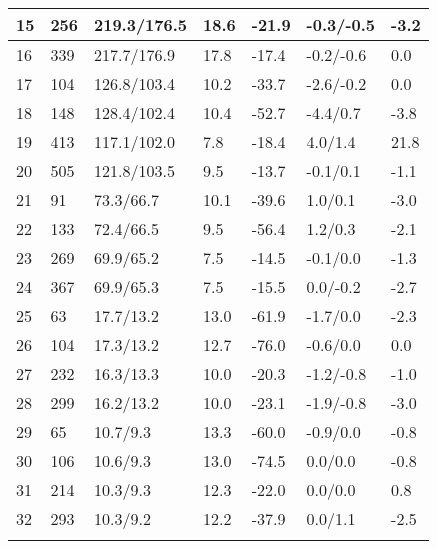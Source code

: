 \begin{table}
\begin{tabular}{|l|l|l|l|l||l|l|}
15 & 256 & 219.3/176.5 & 18.6 & -21.9 & -0.3/-0.5 & -3.2 \\ 
\hline
16 & 339 & 217.7/176.9 & 17.8 & -17.4 & -0.2/-0.6 & 0.0 \\ 
\hline
\hline
17 & 104 & 126.8/103.4 & 10.2 & -33.7 & -2.6/-0.2 & 0.0 \\ 
\hline
18 & 148 & 128.4/102.4 & 10.4 & -52.7 & -4.4/0.7 & -3.8 \\ 
\hline
19 & 413 & 117.1/102.0 & 7.8 & -18.4 & 4.0/1.4 & 21.8 \\ 
\hline
20 & 505 & 121.8/103.5 & 9.5 & -13.7 & -0.1/0.1 & -1.1 \\ 
\hline
21 & 91 & 73.3/66.7 & 10.1 & -39.6 & 1.0/0.1 & -3.0 \\ 
\hline
22 & 133 & 72.4/66.5 & 9.5 & -56.4 & 1.2/0.3 & -2.1 \\ 
\hline
23 & 269 & 69.9/65.2 & 7.5 & -14.5 & -0.1/0.0 & -1.3 \\ 
\hline
24 & 367 & 69.9/65.3 & 7.5 & -15.5 & 0.0/-0.2 & -2.7 \\ 
\hline
\hline
25 & 63 & 17.7/13.2 & 13.0 & -61.9 & -1.7/0.0 & -2.3 \\ 
\hline
26 & 104 & 17.3/13.2 & 12.7 & -76.0 & -0.6/0.0 & 0.0 \\ 
\hline
27 & 232 & 16.3/13.3 & 10.0 & -20.3 & -1.2/-0.8 & -1.0 \\ 
\hline
28 & 299 & 16.2/13.2 & 10.0 & -23.1 & -1.9/-0.8 & -3.0 \\ 
\hline
29 & 65 & 10.7/9.3 & 13.3 & -60.0 & -0.9/0.0 & -0.8 \\ 
\hline
30 & 106 & 10.6/9.3 & 13.0 & -74.5 & 0.0/0.0 & -0.8 \\ 
\hline
31 & 214 & 10.3/9.3 & 12.3 & -22.0 & 0.0/0.0 & 0.8 \\ 
\hline
32 & 293 & 10.3/9.2 & 12.2 & -37.9 & 0.0/1.1 & -2.5 \\ 
\hline
\noalign{\smallskip}\hline
\end{tabular}
\end{table}
